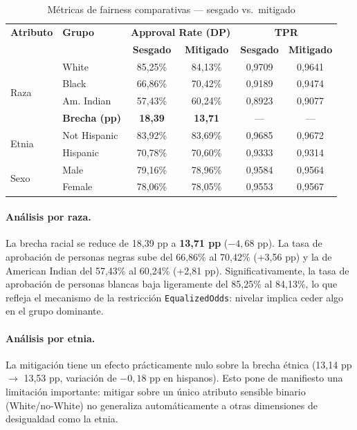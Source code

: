 \documentclass[11pt,a4paper]{article}
\begin{document}
\begin{table}[ht]
\centering
\caption{Métricas de fairness comparativas --- sesgado vs.\ mitigado}
\label{tab:fairness_comparativo}
\small
\begin{tabular}{@{}llcccc@{}}
\toprule
\textbf{Atributo} & \textbf{Grupo} & \multicolumn{2}{c}{\textbf{Approval Rate (DP)}} & \multicolumn{2}{c}{\textbf{TPR}} \\
 & & \textbf{Sesgado} & \textbf{Mitigado} & \textbf{Sesgado} & \textbf{Mitigado} \\ \midrule
\multirow{4}{*}{Raza}
  & White & 85{,}25\% & 84{,}13\% & 0{,}9709 & 0{,}9641 \\
  & Black & 66{,}86\% & 70{,}42\% & 0{,}9189 & 0{,}9474 \\
  & Am. Indian & 57{,}43\% & 60{,}24\% & 0{,}8923 & 0{,}9077 \\
  & \textbf{Brecha (pp)} & \textbf{18{,}39} & \textbf{13{,}71} & --- & --- \\
\midrule
\multirow{2}{*}{Etnia}
  & Not Hispanic & 83{,}92\% & 83{,}69\% & 0{,}9685 & 0{,}9672 \\
  & Hispanic & 70{,}78\% & 70{,}60\% & 0{,}9333 & 0{,}9314 \\
\midrule
\multirow{2}{*}{Sexo}
  & Male & 79{,}16\% & 78{,}96\% & 0{,}9584 & 0{,}9564 \\
  & Female & 78{,}06\% & 78{,}05\% & 0{,}9553 & 0{,}9567 \\
\bottomrule
\end{tabular}
\end{table}
\newpage
\paragraph{Análisis por raza.}

La brecha racial se reduce de 18{,}39 pp a \textbf{13{,}71 pp} ($-4{,}68$ pp). La tasa de
aprobación de personas negras sube del 66{,}86\% al 70{,}42\% (+3{,}56 pp) y la de American
Indian del 57{,}43\% al 60{,}24\% (+2{,}81 pp). Significativamente, la tasa de aprobación de
personas blancas baja ligeramente del 85{,}25\% al 84{,}13\%, lo que refleja el mecanismo de la
restricción \texttt{EqualizedOdds}: nivelar implica ceder algo en el grupo dominante.

\paragraph{Análisis por etnia.}

La mitigación tiene un efecto prácticamente nulo sobre la brecha étnica (13{,}14 pp $\to$
13{,}53 pp, variación de $-0{,}18$ pp en hispanos). Esto pone de manifiesto una limitación
importante: mitigar sobre un único atributo sensible binario (White/no-White) no generaliza
automáticamente a otras dimensiones de desigualdad como la etnia.
\end{document}
